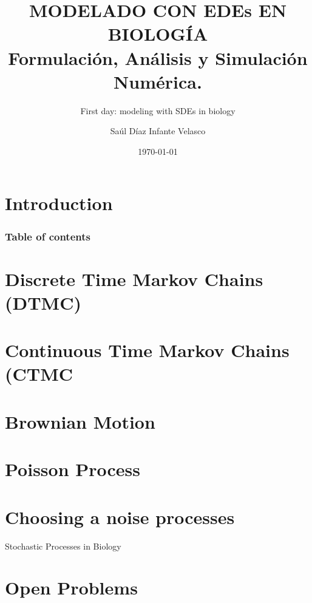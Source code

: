 \documentclass[9pt]{beamer}
\title{MODELADO CON EDEs EN BIOLOGÍA\\
    Formulación, Análisis y Simulación Numérica.}
\subtitle{First day: modeling with SDEs in biology}
\author{Saúl Díaz Infante Velasco}
\institute{CONACYT-UNIVERSIDAD de SONORA, Cimat, Guanajuato Gto}
\date{\today}
\begin{document}
    \titlepage
    \section{Introduction}
        
    \begin{frame}
        \frametitle{Table of contents}
        \tableofcontents
    \end{frame}
    \section{Discrete Time Markov Chains (DTMC)}
        
        
        
%
%
        
    \section{Continuous Time Markov Chains (CTMC}
        
    \section{Brownian Motion}
    
    \section{Poisson Process}
    \section{Choosing a noise processes}
        \begin{frame}{Stochastic Processes in Biology}
        
        \end{frame}
    \section{Open Problems}
\end{document}
